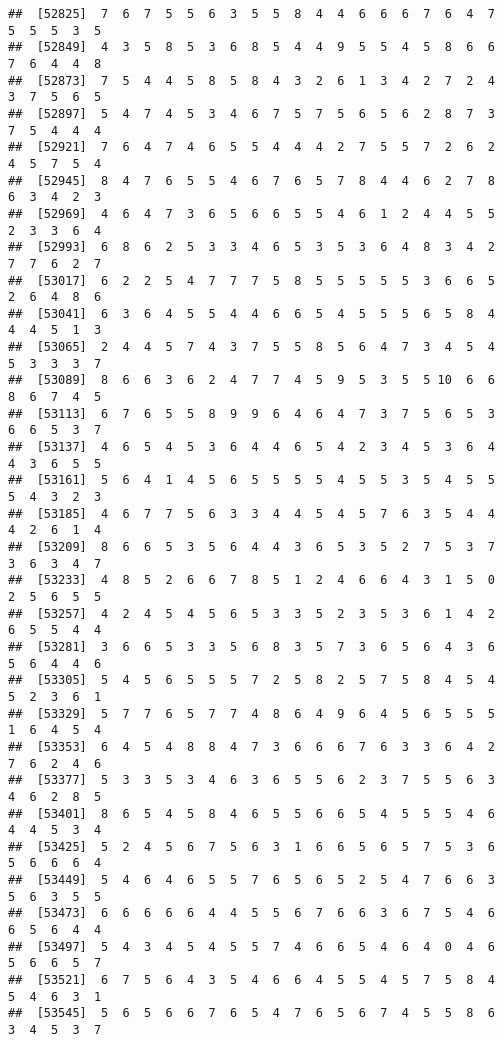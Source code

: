 \documentclass[
]{book}
\begin{document}
\begin{verbatim}
##  [52825]  7  6  7  5  5  6  3  5  5  8  4  4  6  6  6  7  6  4  7  5  5  5  3  5
##  [52849]  4  3  5  8  5  3  6  8  5  4  4  9  5  5  4  5  8  6  6  7  6  4  4  8
##  [52873]  7  5  4  4  5  8  5  8  4  3  2  6  1  3  4  2  7  2  4  3  7  5  6  5
##  [52897]  5  4  7  4  5  3  4  6  7  5  7  5  6  5  6  2  8  7  3  7  5  4  4  4
##  [52921]  7  6  4  7  4  6  5  5  4  4  4  2  7  5  5  7  2  6  2  4  5  7  5  4
##  [52945]  8  4  7  6  5  5  4  6  7  6  5  7  8  4  4  6  2  7  8  6  3  4  2  3
##  [52969]  4  6  4  7  3  6  5  6  6  5  5  4  6  1  2  4  4  5  5  2  3  3  6  4
##  [52993]  6  8  6  2  5  3  3  4  6  5  3  5  3  6  4  8  3  4  2  7  7  6  2  7
##  [53017]  6  2  2  5  4  7  7  7  5  8  5  5  5  5  5  3  6  6  5  2  6  4  8  6
##  [53041]  6  3  6  4  5  5  4  4  6  6  5  4  5  5  5  6  5  8  4  4  4  5  1  3
##  [53065]  2  4  4  5  7  4  3  7  5  5  8  5  6  4  7  3  4  5  4  5  3  3  3  7
##  [53089]  8  6  6  3  6  2  4  7  7  4  5  9  5  3  5  5 10  6  6  8  6  7  4  5
##  [53113]  6  7  6  5  5  8  9  9  6  4  6  4  7  3  7  5  6  5  3  6  6  5  3  7
##  [53137]  4  6  5  4  5  3  6  4  4  6  5  4  2  3  4  5  3  6  4  4  3  6  5  5
##  [53161]  5  6  4  1  4  5  6  5  5  5  5  4  5  5  3  5  4  5  5  5  4  3  2  3
##  [53185]  4  6  7  7  5  6  3  3  4  4  5  4  5  7  6  3  5  4  4  4  2  6  1  4
##  [53209]  8  6  6  5  3  5  6  4  4  3  6  5  3  5  2  7  5  3  7  3  6  3  4  7
##  [53233]  4  8  5  2  6  6  7  8  5  1  2  4  6  6  4  3  1  5  0  2  5  6  5  5
##  [53257]  4  2  4  5  4  5  6  5  3  3  5  2  3  5  3  6  1  4  2  6  5  5  4  4
##  [53281]  3  6  6  5  3  3  5  6  8  3  5  7  3  6  5  6  4  3  6  5  6  4  4  6
##  [53305]  5  4  5  6  5  5  5  7  2  5  8  2  5  7  5  8  4  5  4  5  2  3  6  1
##  [53329]  5  7  7  6  5  7  7  4  8  6  4  9  6  4  5  6  5  5  5  1  6  4  5  4
##  [53353]  6  4  5  4  8  8  4  7  3  6  6  6  7  6  3  3  6  4  2  7  6  2  4  6
##  [53377]  5  3  3  5  3  4  6  3  6  5  5  6  2  3  7  5  5  6  3  4  6  2  8  5
##  [53401]  8  6  5  4  5  8  4  6  5  5  6  6  5  4  5  5  5  4  6  4  4  5  3  4
##  [53425]  5  2  4  5  6  7  5  6  3  1  6  6  5  6  5  7  5  3  6  5  6  6  6  4
##  [53449]  5  4  6  4  6  5  5  7  6  5  6  5  2  5  4  7  6  6  3  5  6  3  5  5
##  [53473]  6  6  6  6  6  4  4  5  5  6  7  6  6  3  6  7  5  4  6  6  5  6  4  4
##  [53497]  5  4  3  4  5  4  5  5  7  4  6  6  5  4  6  4  0  4  6  5  6  6  5  7
##  [53521]  6  7  5  6  4  3  5  4  6  6  4  5  5  4  5  7  5  8  4  5  4  6  3  1
##  [53545]  5  6  5  6  6  7  6  5  4  7  6  5  6  7  4  5  5  8  6  3  4  5  3  7

\end{verbatim}
\end{document}
